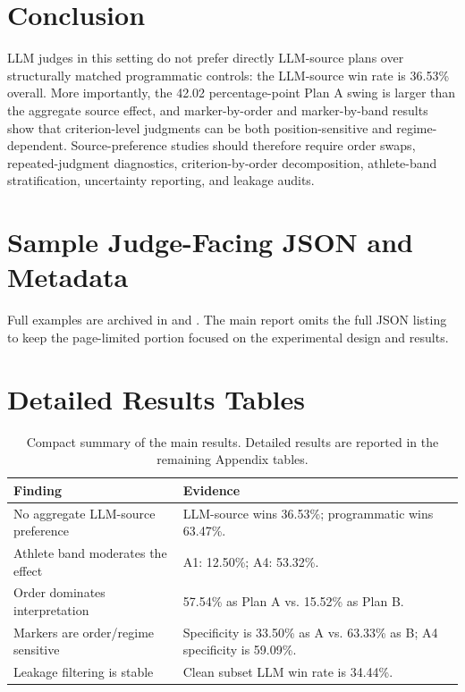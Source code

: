 \documentclass[11pt]{article}
\begin{document}
\section{Conclusion}

LLM judges in this setting do not prefer directly LLM-source plans over structurally matched programmatic controls: the LLM-source win rate is 36.53\% overall. More importantly, the 42.02 percentage-point Plan A swing is larger than the aggregate source effect, and marker-by-order and marker-by-band results show that criterion-level judgments can be both position-sensitive and regime-dependent. Source-preference studies should therefore require order swaps, repeated-judgment diagnostics, criterion-by-order decomposition, athlete-band stratification, uncertainty reporting, and leakage audits.

\clearpage


\clearpage
\onecolumn
\appendix



\section{Sample Judge-Facing JSON and Metadata}
\label{app:samples}
Full examples are archived in  and . The main report omits the full JSON listing to keep the page-limited portion focused on the experimental design and results.

\clearpage
\section{Detailed Results Tables}
\label{app:detailed-tables}
\renewcommand{\thetable}{\thesection.\arabic{table}}
\setcounter{table}{0}

\begin{table}[H]
\centering
\scriptsize
\setlength{\tabcolsep}{3pt}
\begin{tabular}{p{}p{}}
\toprule
Finding & Evidence \\
\midrule
No aggregate LLM-source preference & LLM-source wins 36.53\%; programmatic wins 63.47\%. \\
Athlete band moderates the effect & A1: 12.50\%; A4: 53.32\%. \\
Order dominates interpretation & 57.54\% as Plan A vs. 15.52\% as Plan B. \\
Markers are order/regime sensitive & Specificity is 33.50\% as A vs. 63.33\% as B; A4 specificity is 59.09\%. \\
Leakage filtering is stable & Clean subset LLM win rate is 34.44\%. \\
\bottomrule
\end{tabular}
\caption{Compact summary of the main results. Detailed results are reported in the remaining Appendix tables.}
\label{tab:summary}
\end{table}
\end{document}
